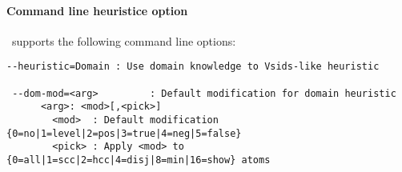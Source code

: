  \paragraph{Command line heuristice option}
 \clasp\ supports the following command line options:
{
\scriptsize\begin{lstlisting}[numbers=none]
 --heuristic=Domain : Use domain knowledge to Vsids-like heuristic

 --dom-mod=<arg>         : Default modification for domain heuristic
      <arg>: <mod>[,<pick>]
        <mod>  : Default modification {0=no|1=level|2=pos|3=true|4=neg|5=false}
        <pick> : Apply <mod> to {0=all|1=scc|2=hcc|4=disj|8=min|16=show} atoms
\end{lstlisting}
}

\iffalse

\fi
